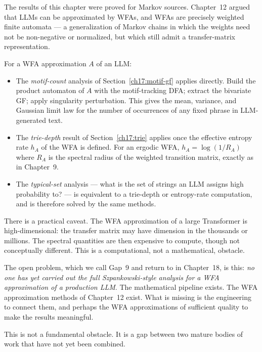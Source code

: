 The results of this chapter were proved for Markov sources. Chapter~12 argued that LLMs can be approximated by WFAs, and WFAs are precisely weighted finite automata --- a generalization of Markov chains in which the weights need not be non-negative or normalized, but which still admit a transfer-matrix representation.

For a WFA approximation $A$ of an LLM:

\begin{itemize}
  \item The \emph{motif-count} analysis of Section~\ref{ch17:motif-gf} applies directly. Build the product automaton of $A$ with the motif-tracking DFA; extract the bivariate GF; apply singularity perturbation. This gives the mean, variance, and Gaussian limit law for the number of occurrences of any fixed phrase in LLM-generated text.

  \item The \emph{trie-depth} result of Section~\ref{ch17:trie} applies once the effective entropy rate $h_A$ of the WFA is defined. For an ergodic WFA, $h_A = \log(1/R_A)$ where $R_A$ is the spectral radius of the weighted transition matrix, exactly as in Chapter~9.

  \item The \emph{typical-set} analysis --- what is the set of strings an LLM assigns high probability to? --- is equivalent to a trie-depth or entropy-rate computation, and is therefore solved by the same methods.
\end{itemize}

\begin{remark}
There is a practical caveat. The WFA approximation of a large Transformer is high-dimensional: the transfer matrix may have dimension in the thousands or millions. The spectral quantities are then expensive to compute, though not conceptually different. This is a computational, not a mathematical, obstacle.
\end{remark}

The open problem, which we call Gap~9 and return to in Chapter~18, is this: \emph{no one has yet carried out the full Szpankowski-style analysis for a WFA approximation of a production LLM}. The mathematical pipeline exists. The WFA approximation methods of Chapter~12 exist. What is missing is the engineering to connect them, and perhaps the WFA approximations of sufficient quality to make the results meaningful.

This is not a fundamental obstacle. It is a gap between two mature bodies of work that have not yet been combined.

